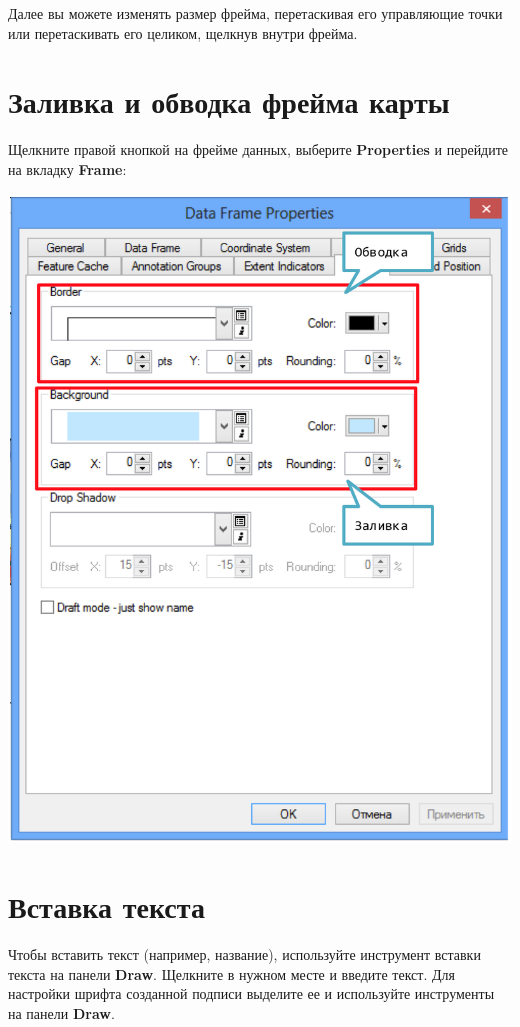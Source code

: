\documentclass[]{book}
\theoremstyle{definition}
\theoremstyle{definition}
\theoremstyle{definition}
\theoremstyle{remark}
\begin{document}
Далее вы можете изменять размер фрейма, перетаскивая его управляющие
точки или перетаскивать его целиком, щелкнув внутри фрейма.

\hypertarget{----}{%
\section{Заливка и обводка фрейма карты}\label{----}}

Щелкните правой кнопкой на фрейме данных, выберите \textbf{Properties} и
перейдите на вкладку \textbf{Frame}:

\includegraphics{images/Appendix/image54.png}

\hypertarget{-}{%
\section{Вставка текста}\label{-}}

Чтобы вставить текст (например, название), используйте инструмент
вставки текста на панели \textbf{Draw}. Щелкните в нужном месте и
введите текст. Для настройки шрифта созданной подписи выделите ее и
используйте инструменты на панели \textbf{Draw}.
\end{document}
